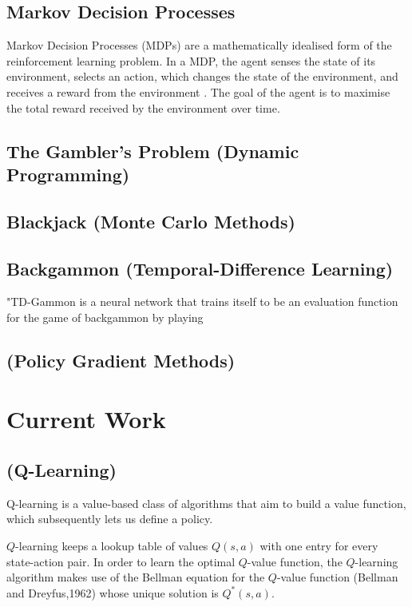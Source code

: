 \documentclass{article}
\begin{document}
\subsection{Markov Decision Processes}

Markov Decision Processes (MDPs) are a mathematically idealised form of the reinforcement learning problem. In a MDP, the agent senses the state of its environment, selects an action, which changes the state of the environment, and receives a reward from the environment \cite{Sutton1998}. The goal of the agent is to maximise the total reward received by the environment over time.

\subsection{The Gambler's Problem (Dynamic Programming)}

\subsection{Blackjack (Monte Carlo Methods)}

\subsection{Backgammon (Temporal-Difference Learning)}

"TD-Gammon is a neural network that trains itself to be an evaluation function for the game of backgammon by playing 

\subsection{(Policy Gradient Methods)}

\section{Current Work}

\subsection{(Q-Learning)}
Q-learning is a value-based class of algorithms that aim to build a value function, which subsequently lets us define a policy.

$Q$-learning keeps a lookup table of values $Q(s,a)$ with one entry for every state-action pair. In order to learn the optimal $Q$-value function, the $Q$-learning algorithm makes use of the Bellman equation for the $Q$-value function (Bellman and Dreyfus,1962) whose unique solution is $Q^*(s,a)$.
\end{document}

